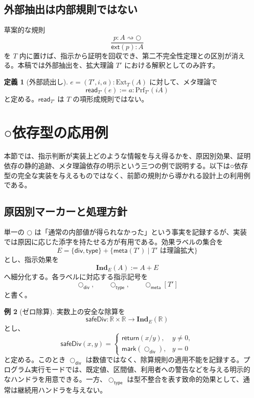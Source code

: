 \documentclass[a4paper,11pt]{ltjsarticle}
\theoremstyle{definition}
\newtheorem{definition}{定義}[section]
\newtheorem{example}[definition]{例}
\theoremstyle{plain}
\newcommand{\dfix}{\bigcirc}
\newcommand{\Ext}{\mathrm{Ext}}
\newcommand{\Prf}{\mathrm{Prf}}
\begin{document}
\subsection{外部抽出は内部規則ではない}

草案的な規則
\[
\frac{p:A\rightsquigarrow\dfix}{\mathsf{ext}(p):A}
\]
を $T$ 内に置けば、指示から証明を回収でき、第二不完全性定理との区別が消える。本稿では外部抽出を、拡大理論 $T'$ における解釈としてのみ許す。

\begin{definition}[外部読出し]
$e=(T',i,a):\Ext_T(A)$ に対して、メタ理論で
\[
 \mathsf{read}_{T'}(e):=a:\Prf_{T'}(iA)
\]
と定める。$\mathsf{read}_{T'}$ は $T$ の項形成規則ではない。
\end{definition}

\section{○依存型の応用例}

本節では、指示判断が実装上どのような情報を与え得るかを、原因別効果、証明依存の静的追跡、メタ理論依存の明示という三つの例で説明する。以下は○依存型の完全な実装を与えるものではなく、前節の規則から導かれる設計上の利用例である。

\subsection{原因別マーカーと処理方針}

単一の $\dfix$ は「通常の内部値が得られなかった」という事実を記録するが、実装では原因に応じた添字を持たせる方が有用である。効果ラベルの集合を
\[
 E=\{\mathsf{div},\mathsf{type}\}
   +\{\mathsf{meta}(T')\mid T'\text{ は理論拡大}\}
\]
とし、指示効果を
\[
 \mathbf{Ind}_E(A):=A+E
\]
へ細分化する。各ラベルに対応する指示記号を
\[
 \dfix_{\mathsf{div}},\qquad
 \dfix_{\mathsf{type}},\qquad
 \dfix_{\mathsf{meta}}[T']
\]
と書く。

\begin{example}[ゼロ除算]
実数上の安全な除算を
\[
 \mathsf{safeDiv}:\mathbb{R}\times\mathbb{R}
 \longrightarrow \mathbf{Ind}_E(\mathbb{R})
\]
とし、
\[
 \mathsf{safeDiv}(x,y)=
 \begin{cases}
  \mathsf{return}(x/y),&y\neq0,\\
  \mathsf{mark}(\dfix_{\mathsf{div}}),&y=0
 \end{cases}
\]
と定める。このとき $\dfix_{\mathsf{div}}$ は数値ではなく、除算規則の適用不能を記録する。プログラム実行モードでは、既定値、区間値、利用者への警告などを与える明示的なハンドラを用意できる。一方、$\dfix_{\mathsf{type}}$ は型不整合を表す致命的効果として、通常は継続用ハンドラを与えない。
\end{example}
\end{document}
